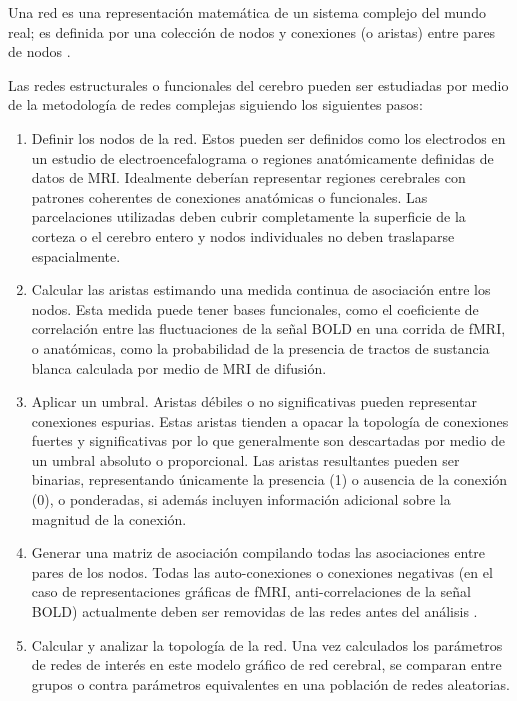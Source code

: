 Una red es una representación matemática de un sistema complejo del mundo real; es definida por una colección de nodos y conexiones (o aristas) entre pares de nodos \parencite{Bullmore2009a,Rubinov2010}. \par
Las redes estructurales o funcionales del cerebro pueden ser estudiadas por medio de la metodología de redes complejas siguiendo los siguientes pasos:
\begin{enumerate}
    \item Definir los nodos de la red.
        Estos pueden ser definidos como los electrodos en un estudio de electroencefalograma o regiones anatómicamente definidas de datos de MRI.
        Idealmente deberían representar regiones cerebrales con patrones coherentes de conexiones anatómicas o funcionales.
        Las parcelaciones utilizadas deben cubrir completamente la superficie de la corteza o el cerebro entero y nodos individuales no deben traslaparse espacialmente.
    \item Calcular las aristas estimando una medida continua de asociación entre los nodos.
        Esta medida puede tener bases funcionales, como el coeficiente de correlación entre las fluctuaciones de la señal BOLD en una corrida de fMRI, o anatómicas, como la probabilidad de la presencia de tractos de sustancia blanca calculada por medio de MRI de difusión.
    \item Aplicar un umbral.
        Aristas débiles o no significativas pueden representar conexiones espurias.
        Estas aristas tienden a opacar la topología de conexiones fuertes y significativas por lo que generalmente son descartadas por medio de un umbral absoluto o proporcional.
        Las aristas resultantes pueden ser binarias, representando únicamente la presencia (1) o ausencia de la conexión (0), o ponderadas, si además incluyen información adicional sobre la magnitud de la conexión.
    \item Generar una matriz de asociación compilando todas las asociaciones entre pares de los nodos.
        Todas las auto-conexiones o conexiones negativas (en el caso de representaciones gráficas de fMRI, anti-correlaciones de la señal BOLD) actualmente deben ser removidas de las redes antes del análisis \parencite{Rubinov2010}.
    \item Calcular y analizar la topología de la red.
        Una vez calculados los parámetros de redes de interés en este modelo gráfico de red cerebral, se comparan entre grupos o contra parámetros equivalentes en una población de redes aleatorias.
\end{enumerate}

